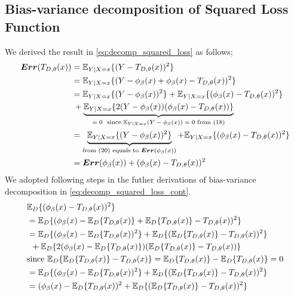 \subsection{Bias-variance decomposition of Squared Loss Function}
We derived the result in \autoref{eq:decomp_squared_loss} as follows;
\begin{align}
\boldsymbol{Err}(T_{D, \theta}(x)) & = \mathbb{E}_{Y|X=x}\{(Y-T_{D,\theta}(x))^2\} \notag \\
							  & = \mathbb{E}_{Y|X=x}\{(Y -\phi_{\beta}(x) +\phi_{\beta}(x) -T_{D,\theta}(x))^2\} \notag \\
							  & = \mathbb{E}_{Y|X=x}\{(Y-\phi_{\beta}(x))^2\} + \mathbb{E}_{Y|X=x}\{(\phi_{\beta}(x)-T_{D,\theta}(x))^2\} \notag \\
							  &	\: + \underbrace{\mathbb{E}_{Y|X=x}\{2(Y-\phi_{\beta}(x))(\phi_{\beta}(x)-T_{D,\theta}(x))\}}_\text{$=0$ \ since $ \mathbb{E}_{Y|X=x}(Y-\phi_{\beta}(x)) = 0$ from $(18)$}  \notag \\
							  & = \underbrace{\mathbb{E}_{Y|X=x}\{(Y-\phi_{\beta}(x))^2\}}_\text{from $(20)$ equals to $\boldsymbol{Err}(\phi_{\beta}(x))$} + \mathbb{E}_{Y|X=x}\{(\phi_{\beta}(x)-T_{D,\theta}(x))^2\}  \notag \\
							  & = \boldsymbol{Err}(\phi_{\beta}(x)) + (\phi_{\beta}(x)-T_{D,\theta}(x))^2\notag
\end{align}
We adopted following steps in the futher derivations of bias-variance decomposition in \autoref{eq:decomp_squared_loss_cont}.
\begin{align}
& \mathbb{E}_{D}\{(\phi_{\beta}(x) - T_{D,\theta}(x))^2 \} \notag \\
& = \mathbb{E}_{D}\{(\phi_{\beta}(x) - \mathbb{E}_{D}\{T_{D,\theta}(x)\} + \mathbb{E}_{D}\{T_{D,\theta}(x)\} - T_{D,\theta}(x))^2\} \notag \\
& = \mathbb{E}_{D}\{(\phi_{\beta}(x) - \mathbb{E}_{D}\{T_{D,\theta}(x))^2\} 
	+ \mathbb{E}_{D}\{(\mathbb{E}_{D}\{T_{D,\theta}(x)\} - T_{D,\theta}(x))^2\} \notag \\
&\: \: + \mathbb{E}_{D}\{2(\phi_{\beta}(x) - \mathbb{E}_{D}\{T_{D,\theta}(x)\})(\mathbb{E}_{D}\{T_{D,\theta}(x)\} - T_{D,\theta}(x))\} \notag \\
& \text{since $\mathbb{E}_{D}\{\mathbb{E}_{D}\{T_{D,\theta}(x)\} - T_{D,\theta}(x)\} = \mathbb{E}_{D}\{T_{D,\theta}(x)\} - \mathbb{E}_{D}\{T_{D,\theta}(x)\} = 0$} \notag \\
& = \mathbb{E}_{D}\{(\phi_{\beta}(x) - \mathbb{E}_{D}\{T_{D,\theta}(x))^2\} 
	+ \mathbb{E}_{D}\{(\mathbb{E}_{D}\{T_{D,\theta}(x)\} - T_{D,\theta}(x))^2\} \notag \\
& = (\phi_{\beta}(x) - \mathbb{E}_{D}\{T_{D,\theta}(x))^2 + \mathbb{E}_{D}\{(\mathbb{E}_{D}\{T_{D,\theta}(x)\} - T_{D,\theta}(x))^2\}\notag
\end{align}

